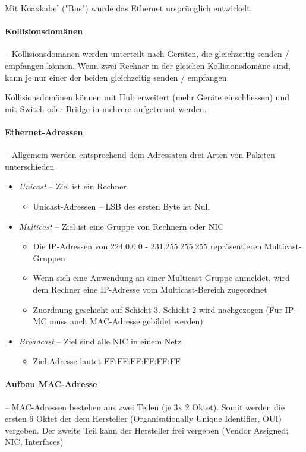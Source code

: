 \documentclass[a4paper,12pt]{article}
\begin{document}
Mit Koaxkabel ("Bus") wurde das Ethernet ursprünglich entwickelt.

\paragraph{Kollisionsdomänen} -- Kollisionsdomänen werden unterteilt nach Geräten, die gleichzeitig senden / empfangen können. Wenn zwei Rechner in der gleichen Kollisionsdomäne sind, kann je nur einer der beiden gleichzeitig senden / empfangen.

Kollisionsdomänen können mit Hub erweitert (mehr Geräte einschliessen) und mit Switch oder Bridge in mehrere aufgetrennt werden.

\paragraph{Ethernet-Adressen} -- Allgemein werden entsprechend dem Adressaten drei Arten von Paketen unterschieden
\begin{itemize}
\item \emph{Unicast} -- Ziel ist ein Rechner
	\begin{itemize}
	\item Unicast-Adressen -- LSB des ersten Byte ist Null
	\end{itemize}
\item \emph{Multicast} -- Ziel ist eine Gruppe von Rechnern oder NIC
	\begin{itemize}
	\item Die IP-Adressen von 224.0.0.0 - 231.255.255.255 repräsentieren Multicast-Gruppen
	\item Wenn sich eine Anwendung an einer Multicast-Gruppe anmeldet, wird dem Rechner eine IP-Adresse vom Multicast-Bereich zugeordnet
	\item Zuordnung geschieht auf Schicht 3. Schicht 2 wird nachgezogen (Für IP-MC muss auch MAC-Adresse gebildet werden)
	\end{itemize}
\item \emph{Broadcast} -- Ziel sind alle NIC in einem Netz
	\begin{itemize}
	\item Ziel-Adresse lautet FF:FF:FF:FF:FF:FF
	\end{itemize}
\end{itemize}

\paragraph{Aufbau MAC-Adresse} -- MAC-Adressen bestehen aus zwei Teilen (je 3x 2 Oktet). Somit werden die ersten 6 Oktet der dem Hersteller (Organisationally Unique Identifier, OUI) vergeben. Der zweite Teil kann der Hersteller frei vergeben (Vendor Assigned; NIC, Interfaces)
\end{document}
